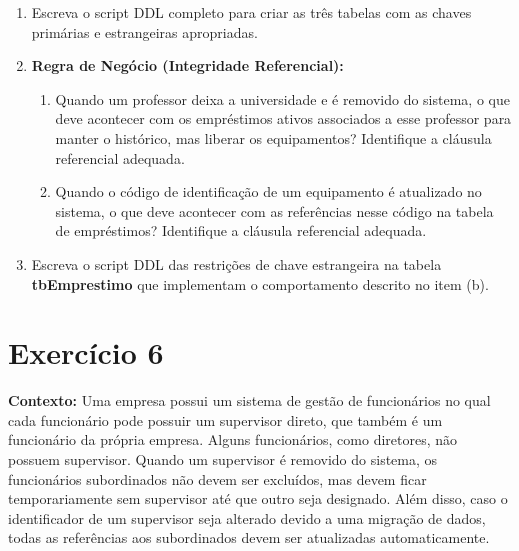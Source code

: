 \documentclass[12pt,a4paper]{article}
\newcommand{\resposta}[1]{}
\begin{document}
\begin{enumerate}[label=\textbf{\alph*)}]
    \item Escreva o script DDL completo para criar as três tabelas com as chaves primárias e estrangeiras apropriadas.
    \resposta{4cm}
    
    \item \textbf{Regra de Negócio (Integridade Referencial):} 
    \begin{enumerate}[label=\arabic*.]
        \item Quando um professor deixa a universidade e é removido do sistema, o que deve acontecer com os empréstimos ativos associados a esse professor para manter o histórico, mas liberar os equipamentos? Identifique a cláusula referencial adequada.
        \item Quando o código de identificação de um equipamento é atualizado no sistema, o que deve acontecer com as referências nesse código na tabela de empréstimos? Identifique a cláusula referencial adequada.
    \end{enumerate}
    \resposta{3cm}
    
    \item Escreva o script DDL das restrições de chave estrangeira na tabela \textbf{tbEmprestimo} que implementam o comportamento descrito no item (b).
    \resposta{3cm}
\end{enumerate}
\section*{Exercício 6}

\textbf{Contexto:} Uma empresa possui um sistema de gestão de funcionários no qual cada funcionário pode possuir um supervisor direto, que também é um funcionário da própria empresa. Alguns funcionários, como diretores, não possuem supervisor. Quando um supervisor é removido do sistema, os funcionários subordinados não devem ser excluídos, mas devem ficar temporariamente sem supervisor até que outro seja designado. Além disso, caso o identificador de um supervisor seja alterado devido a uma migração de dados, todas as referências aos subordinados devem ser atualizadas automaticamente.
\end{document}
